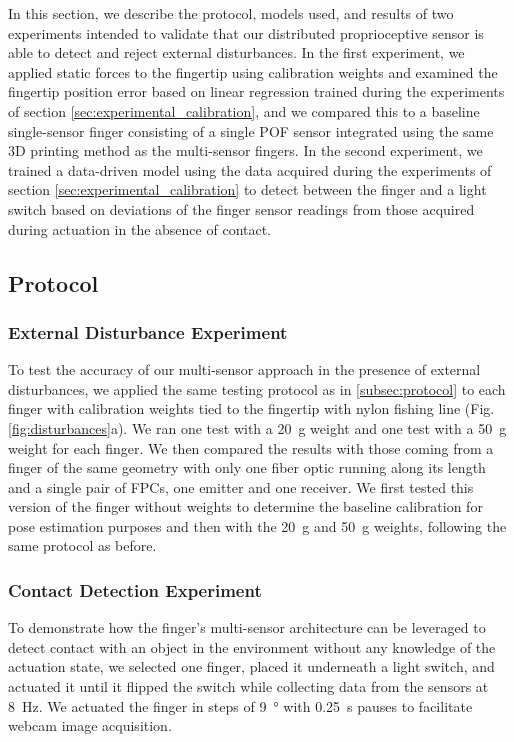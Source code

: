 In this section, we describe the protocol, models used, and results of two experiments intended to validate that our distributed proprioceptive sensor is able to detect and reject external disturbances. In the first experiment, we applied static forces to the fingertip using calibration weights and examined the fingertip position error based on linear regression trained during the experiments of section \ref{sec:experimental_calibration}, and we compared this to a baseline single-sensor finger consisting of a single POF sensor integrated using the same 3D printing method as the multi-sensor fingers. In the second experiment, we trained a data-driven model using the data acquired during the experiments of section \ref{sec:experimental_calibration} to detect between the finger and a light switch based on deviations of the finger sensor readings from those acquired during actuation in the absence of contact. 
\subsection{Protocol}
\subsubsection{External Disturbance Experiment}
To test the accuracy of our multi-sensor approach in the presence of external disturbances, we applied the same testing protocol as in \ref{subsec:protocol} to each finger with calibration weights tied to the fingertip with nylon fishing line (Fig. \ref{fig:disturbances}a). We ran one test with a \qty{20}{g} weight and one test with a \qty{50}{g} weight for each finger. We then compared the results with those coming from a finger of the same geometry with only one fiber optic running along its length and a single pair of FPCs, one emitter and one receiver. We first tested this version of the finger without weights to determine the baseline calibration for pose estimation purposes and then with the \qty{20}{g} and \qty{50}{g} weights, following the same protocol as before. 

\subsubsection{Contact Detection Experiment}
To demonstrate how the finger's multi-sensor architecture can be leveraged to detect contact with an object in the environment without any knowledge of the actuation state, we selected one finger, placed it underneath a light switch, and actuated it until it flipped the switch while collecting data from the sensors at \qty{8}{Hz}. We actuated the finger in steps of \qty{9}{\degree} with \qty{0.25}{\s} pauses to facilitate webcam image acquisition.


